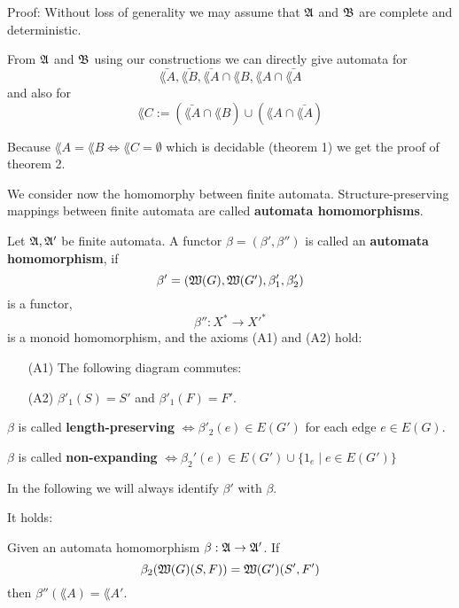 Proof: Without loss of generality we may assume that $\mbox{$\mathfrak{A}$}$ and $\mbox{$\mathfrak{B}$}$ are
complete and deterministic. 

From $\mbox{$\mathfrak{A}$}$ and $\mbox{$\mathfrak{B}$}$ using our constructions we can directly give automata
for 
\[\bar{\lang{A}}, \bar{\lang{B}}, \bar{\lang{A}} \cap
\lang{B}, \lang{A} \cap \bar{\lang{A}}\]
and also for 
\[ \lang{C} := (\bar{\lang{A}} \cap \lang{B}) \cup (\lang{A} \cap
\bar{\lang{A}}) \]

Because $\lang{A} = \lang{B} \Leftrightarrow \lang{C} = \emptyset$ which
is decidable (theorem 1) we get the proof of theorem 2.

We consider now the homomorphy between finite automata. Structure-preserving
mappings between finite automata are called {\bf automata homomorphisms}.

\begin{definition}
Let $\mbox{$\mathfrak{A}$}, \mbox{$\mathfrak{A'}$}$ be finite automata. A functor $\beta = (\beta', \beta'')$
is called an {\bf automata homomorphism}, if
\[ \beta' = (\mbox{$\mathfrak{W}(G)$}, \mbox{$\mathfrak{W}(G')$}, \beta'_1, \beta'_2) \]
is a functor,
\[ \beta'': X^* \to X'^*	\]
is a monoid homomorphism, and the axioms (A1) and (A2) hold:
\begin{itemize}
  \item[(A1)] The following diagram commutes:
  
  
  \item[(A2)] $\beta'_1(S) = S'$ and $\beta'_1(F) = F'$. 
\end{itemize}

$\beta$ is called {\bf length-preserving} $\Leftrightarrow \beta'_2(e) \in
E(G')$ for each edge $e \in E(G)$.

$\beta$ is called {\bf non-expanding} $\Leftrightarrow \beta_2'(e) \in E(G')
\cup \{ 1_e \mid e \in E(G') \}$
\end{definition}

In the following we will always identify $\beta'$ with $\beta$.

It holds:

\begin{theorem}
Given an automata homomorphism $\beta: \mbox{$\mathfrak{A}$} \to \mbox{$\mathfrak{A'}$}$. If
\[\beta_2(\mbox{$\mathfrak{W}(G)$}(S,F)) = \mbox{$\mathfrak{W}(G')$}(S',F')\]
then $\beta''(\lang{A}) = \lang{A'}$.
\end{theorem}

